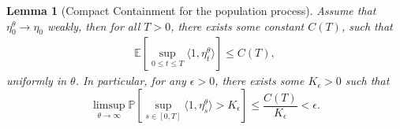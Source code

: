 \documentclass[12pt]{article}
\newtheorem{lemma}[theorem]{Lemma}
\newcommand{\IE}{\mathbb E}
\begin{document}
\begin{lemma}[Compact Containment for the population process]
    \label{lem: Compact Containment}
Assume that $\eta^{\theta}_0 \to \eta_0$ weakly,
then for all $T>0$, there exists some constant $C(T)$,
such that
    \begin{align}
        \IE\left[
            \sup_{0 \le t \le T}
            \langle 1, \eta^\theta_t \rangle
        \right]
        \le C(T) ,
    \end{align}
uniformly in $\theta$.
In particular, for any $\epsilon > 0$, there exists some $K_{\epsilon}>0$ such that
\begin{equation}
\limsup_{\theta \to \infty}
    \mathbb{P}\left[\sup_{s \in [0,T]}
        \langle 1 ,\eta^{\theta}_{s}\rangle
        > K_\epsilon \right]
        \leq \frac{C(T)}{K_{\epsilon}} < \epsilon.    
\end{equation}
\end{lemma}
\end{document}
